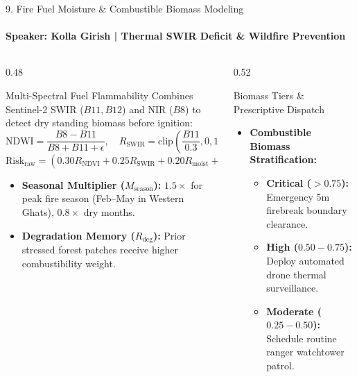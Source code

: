 \documentclass[aspectratio=169, 11pt]{beamer}
\let\oldcite\cite
\renewcommand{\cite}[1]{\hyperlink{ref:references_slide}{\textcolor{amritaMaroon}{\oldcite{#1}}}}
\begin{document}
\begin{frame}{9. Fire Fuel Moisture \& Combustible Biomass Modeling}
    \framesubtitle{\textbf{\textcolor{amritaGold}{Speaker: Kolla Girish}} \quad | \quad Thermal SWIR Deficit \& Wildfire Prevention}
    \begin{columns}[c]
        \begin{column}{0.48\textwidth}
            \begin{block}{Multi-Spectral Fuel Flammability}
                \footnotesize
                Combines Sentinel-2 SWIR ($B11, B12$) and NIR ($B8$) \cite{drusch2012sentinel} to detect dry standing biomass before ignition:
                $$\text{NDWI} = \frac{B8 - B11}{B8 + B11 + \epsilon}, \quad R_{\text{SWIR}} = \text{clip}\left(\frac{B11}{0.3}, 0, 1\right)$$
                $$\text{Risk}_{\text{raw}} = \left(0.30 R_{\text{NDVI}} + 0.25 R_{\text{SWIR}} + 0.20 R_{\text{moist}} + 0.25 R_{\text{deg}}\right) \times M_{\text{season}}$$
                \begin{itemize}
                    \item \textbf{Seasonal Multiplier ($M_{\text{season}}$):} $1.5\times$ for peak fire season (Feb--May in Western Ghats), $0.8\times$ dry months.
                    \item \textbf{Degradation Memory ($R_{\text{deg}}$):} Prior stressed forest patches receive higher combustibility weight.
                \end{itemize}
            \end{block}
        \end{column}
        \begin{column}{0.52\textwidth}
            \begin{exampleblock}{Biomass Tiers \& Prescriptive Dispatch}
                \footnotesize
                \begin{itemize}
                    \item \textbf{Combustible Biomass Stratification:}
                        \begin{itemize}
                            \item \textbf{Critical ($>0.75$):} Emergency 5m firebreak boundary clearance.
                            \item \textbf{High ($0.50 - 0.75$):} Deploy automated drone thermal surveillance.
                            \item \textbf{Moderate ($0.25 - 0.50$):} Schedule routine ranger watchtower patrol.

\end{itemize}
\end{itemize}
\end{exampleblock}
\end{column}
\end{columns}
\end{frame}
\end{document}
